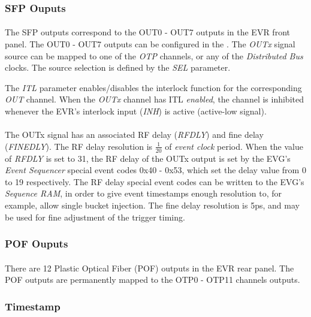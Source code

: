 \documentclass[openany]{article}
\begin{document}
		\subsubsection{SFP Ouputs}\label{sec:evr-sfp-outputs}

			\paragraph{} The SFP outputs correspond to the OUT0 - OUT7 outputs in the EVR front panel. The OUT0 - OUT7 outputs can be configured in the . The \emph{OUTx} signal source can be mapped to one of the \emph{OTP} channels, or any of the \emph{Distributed Bus} clocks. The source selection is defined by the \emph{SEL} parameter.
			\par The \emph{ITL} parameter enables/disables the interlock function for the corresponding \emph{OUT} channel. When the \emph{OUTx} channel has ITL \emph{enabled}, the channel is inhibited whenever the EVR's interlock input (\emph{INH}) is active (active-low signal).
			\paragraph{} The OUTx signal has an associated RF delay (\emph{RFDLY}) and fine delay (\emph{FINEDLY}). The RF delay resolution is \(\frac{1}{20}\) of \emph{event clock} period. When the value of \emph{RFDLY} is set to 31, the RF delay of the OUTx output is set by the EVG's \emph{Event Sequencer} special event codes 0x40 - 0x53, which set the delay value from 0 to 19 respectively. The RF delay special event codes can be written to the EVG's \emph{Sequence RAM}, in order to give event timestamps enough resolution to, for example, allow single bucket injection. The fine delay resolution is 5ps, and may be used for fine adjustment of the trigger timing.

		\subsubsection{POF Ouputs}\label{sec:evr-pof-outputs}

			\paragraph{} There are 12 Plastic Optical Fiber (POF) outputs in the EVR rear panel. The POF outputs are permanently mapped to the OTP0 - OTP11 channels outputs.

		\subsubsection{Timestamp}\label{sec:evr-timestamp}
		
\end{document}
